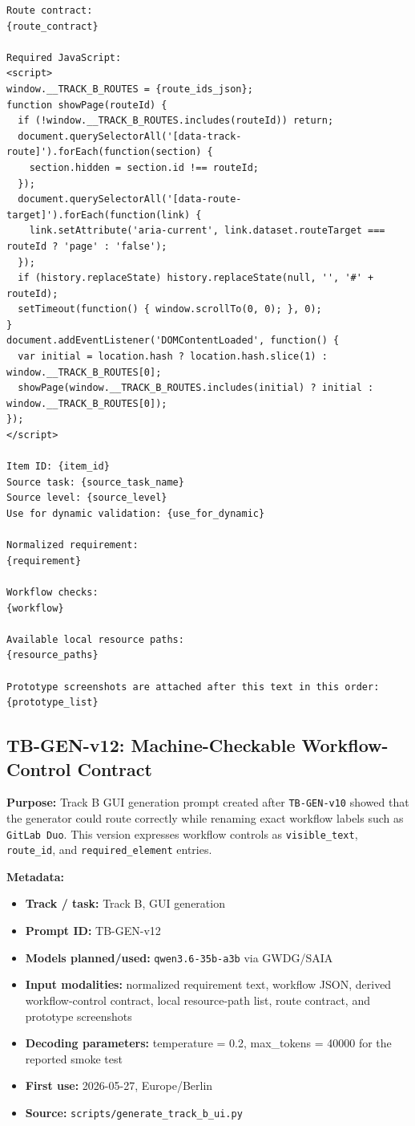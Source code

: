 \begin{verbatim}
Route contract:
{route_contract}

Required JavaScript:
<script>
window.__TRACK_B_ROUTES = {route_ids_json};
function showPage(routeId) {
  if (!window.__TRACK_B_ROUTES.includes(routeId)) return;
  document.querySelectorAll('[data-track-route]').forEach(function(section) {
    section.hidden = section.id !== routeId;
  });
  document.querySelectorAll('[data-route-target]').forEach(function(link) {
    link.setAttribute('aria-current', link.dataset.routeTarget === routeId ? 'page' : 'false');
  });
  if (history.replaceState) history.replaceState(null, '', '#' + routeId);
  setTimeout(function() { window.scrollTo(0, 0); }, 0);
}
document.addEventListener('DOMContentLoaded', function() {
  var initial = location.hash ? location.hash.slice(1) : window.__TRACK_B_ROUTES[0];
  showPage(window.__TRACK_B_ROUTES.includes(initial) ? initial : window.__TRACK_B_ROUTES[0]);
});
</script>

Item ID: {item_id}
Source task: {source_task_name}
Source level: {source_level}
Use for dynamic validation: {use_for_dynamic}

Normalized requirement:
{requirement}

Workflow checks:
{workflow}

Available local resource paths:
{resource_paths}

Prototype screenshots are attached after this text in this order:
{prototype_list}
\end{verbatim}
\endgroup

\subsection{TB-GEN-v12: Machine-Checkable Workflow-Control Contract}
\label{app:prompt-tb-gen-v12}

\textbf{Purpose:} Track B GUI generation prompt created after
\texttt{TB-GEN-v10} showed that the generator could route correctly while
renaming exact workflow labels such as \texttt{GitLab Duo}. This version
expresses workflow controls as \texttt{visible\_text}, \texttt{route\_id}, and
\texttt{required\_element} entries.

\textbf{Metadata:}
\begin{itemize}
  \item \textbf{Track / task:} Track B, GUI generation
  \item \textbf{Prompt ID:} TB-GEN-v12
  \item \textbf{Models planned/used:} \texttt{qwen3.6-35b-a3b} via GWDG/SAIA
  \item \textbf{Input modalities:} normalized requirement text, workflow JSON,
  derived workflow-control contract, local resource-path list, route contract,
  and prototype screenshots
  \item \textbf{Decoding parameters:} temperature = 0.2, max\_tokens = 40000
  for the reported smoke test
  \item \textbf{First use:} 2026-05-27, Europe/Berlin
  \item \textbf{Source:} \texttt{scripts/generate\_track\_b\_ui.py}
\end{itemize}


